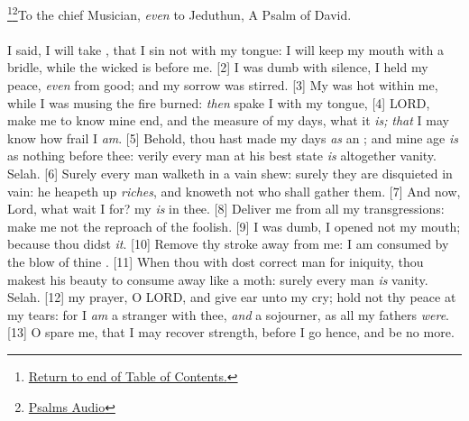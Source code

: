 \footnote{\textcolor[cmyk]{0.99998,1,0,0}{\hyperlink{TOC}{Return to end of Table of Contents.}}}\footnote{\href{https://audiobible.com/bible}{\textcolor[cmyk]{0.99998,1,0,0}{Psalms Audio}}}\textcolor[cmyk]{0.99998,1,0,0}{To the chief Musician, \emph{even} to Jeduthun, A Psalm of David.}\\
\\
\textcolor[cmyk]{0.99998,1,0,0}{I said, I will take , that I sin not with my tongue: I will keep my mouth with a bridle, while the wicked is before me.}
[2] \textcolor[cmyk]{0.99998,1,0,0}{I was dumb with silence, I held my peace, \emph{even} from good; and my sorrow was stirred.}
[3] \textcolor[cmyk]{0.99998,1,0,0}{My  was hot within me, while I was musing the fire burned: \emph{then} spake I with my tongue,}
[4] \textcolor[cmyk]{0.99998,1,0,0}{LORD, make me to know mine end, and the measure of my days, what it \emph{is;} \emph{that} I may know how frail I \emph{am}.}
[5] \textcolor[cmyk]{0.99998,1,0,0}{Behold, thou hast made my days \emph{as} an ; and mine age \emph{is} as nothing before thee: verily every man at his best state \emph{is} altogether vanity. Selah.}
[6] \textcolor[cmyk]{0.99998,1,0,0}{Surely every man walketh in a vain shew: surely they are disquieted in vain: he heapeth up \emph{riches}, and knoweth not who shall gather them.}
[7] \textcolor[cmyk]{0.99998,1,0,0}{And now, Lord, what wait I for? my  \emph{is} in thee.}
[8] \textcolor[cmyk]{0.99998,1,0,0}{Deliver me from all my transgressions: make me not the reproach of the foolish.}
[9] \textcolor[cmyk]{0.99998,1,0,0}{I was dumb, I opened not my mouth; because thou didst \emph{it}.}
[10] \textcolor[cmyk]{0.99998,1,0,0}{Remove thy stroke away from me: I am consumed by the blow of thine .}
[11] \textcolor[cmyk]{0.99998,1,0,0}{When thou with  dost correct man for iniquity, thou makest his beauty to consume away like a moth: surely every man \emph{is} vanity. Selah.}
[12] \textcolor[cmyk]{0.99998,1,0,0}{ my prayer, O LORD, and give ear unto my cry; hold not thy peace at my tears: for I \emph{am} a stranger with thee, \emph{and} a sojourner, as all my fathers \emph{were}.}
[13] \textcolor[cmyk]{0.99998,1,0,0}{O spare me, that I may recover strength, before I go hence, and be no more.}



